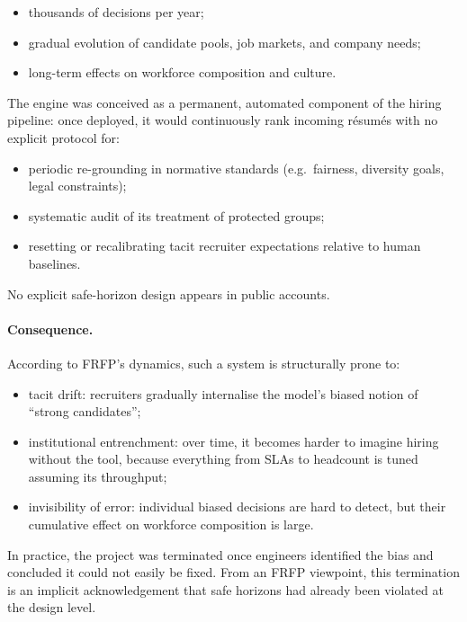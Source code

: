 \begin{itemize}
  \item thousands of decisions per year;
  \item gradual evolution of candidate pools, job markets, and company needs;
  \item long-term effects on workforce composition and culture.
\end{itemize}

The engine was conceived as a permanent, automated component of the hiring
pipeline:
once deployed, it would continuously rank incoming résumés with no explicit
protocol for:

\begin{itemize}
  \item periodic re-grounding in normative standards
        (e.g.\ fairness, diversity goals, legal constraints);
  \item systematic audit of its treatment of protected groups;
  \item resetting or recalibrating tacit recruiter expectations relative to
        human baselines.
\end{itemize}

No explicit safe-horizon design appears in public accounts.

\paragraph{Consequence.}
According to FRFP’s dynamics, such a system is structurally prone to:

\begin{itemize}
  \item tacit drift: recruiters gradually internalise the model’s biased
        notion of ``strong candidates'';
  \item institutional entrenchment: over time, it becomes harder to imagine
        hiring without the tool, because everything from SLAs to headcount
        is tuned assuming its throughput;
  \item invisibility of error: individual biased decisions are hard to detect,
        but their cumulative effect on workforce composition is large.
\end{itemize}

In practice, the project was terminated once engineers identified the bias
and concluded it could not easily be fixed.
From an FRFP viewpoint, this termination is an implicit acknowledgement that
safe horizons had already been violated at the design level.

